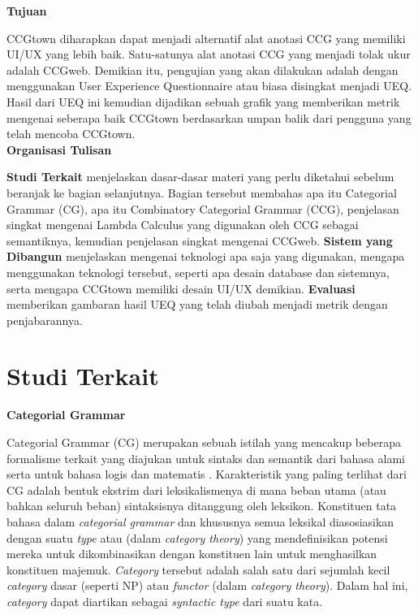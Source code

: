 \noindent\textbf{Tujuan}

CCGtown diharapkan dapat menjadi alternatif alat anotasi CCG yang memiliki UI/UX yang lebih baik.
Satu-satunya alat anotasi CCG yang menjadi tolak ukur adalah CCGweb.
Demikian itu, pengujian yang akan dilakukan adalah dengan menggunakan User Experience Questionnaire
atau biasa disingkat menjadi UEQ. Hasil dari UEQ ini kemudian dijadikan sebuah grafik yang memberikan
metrik mengenai seberapa baik CCGtown berdasarkan umpan balik dari pengguna yang telah mencoba
CCGtown.
\\


\noindent \textbf{Organisasi Tulisan}

\textbf{Studi Terkait} menjelaskan dasar-dasar materi yang perlu diketahui sebelum beranjak ke bagian
selanjutnya. Bagian tersebut membahas apa itu Categorial Grammar (CG), apa itu Combinatory
Categorial Grammar (CCG), penjelasan singkat mengenai Lambda Calculus yang digunakan oleh CCG sebagai
semantiknya, kemudian penjelasan singkat mengenai CCGweb.
\textbf{Sistem yang Dibangun} menjelaskan mengenai teknologi apa saja yang digunakan, mengapa
menggunakan teknologi tersebut, seperti apa desain database dan sistemnya, serta mengapa CCGtown
memiliki desain UI/UX demikian.
\textbf{Evaluasi} memberikan gambaran hasil UEQ yang telah diubah menjadi metrik dengan penjabarannya.



\section{Studi Terkait}

\noindent\textbf{Categorial Grammar}

Categorial Grammar (CG) merupakan sebuah istilah yang mencakup beberapa formalisme terkait yang diajukan
untuk sintaks dan semantik dari bahasa alami serta untuk bahasa logis dan matematis \citep{Steedman92catg}.
Karakteristik yang paling terlihat dari CG adalah bentuk ekstrim dari leksikalismenya di mana beban utama
(atau bahkan seluruh beban) sintaksisnya ditanggung oleh leksikon.
Konstituen tata bahasa dalam \textit{categorial grammar} dan khususnya semua leksikal diasosiasikan
dengan suatu \textit{type} atau  (dalam \textit{category theory}) yang
mendefinisikan potensi mereka untuk dikombinasikan dengan konstituen lain untuk menghasilkan konstituen
majemuk.
\textit{Category} tersebut adalah salah satu dari sejumlah kecil \textit{category} dasar (seperti NP)
atau \textit{functor} (dalam \textit{category theory}).
Dalam hal ini, \textit{category} dapat diartikan sebagai \textit{syntactic type} dari suatu kata.

